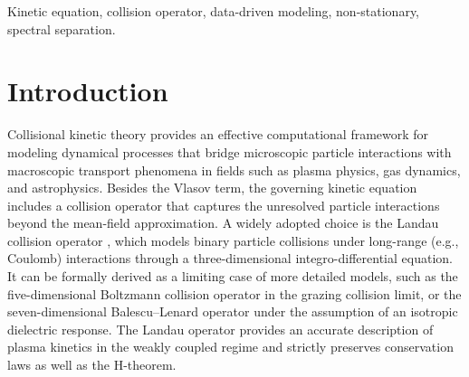 \documentclass[preprint,1p,times]{elsarticle}
\theoremstyle{definition}
\theoremstyle{remark}
\begin{document}
\begin{frontmatter}


\begin{keyword}
Kinetic equation, collision operator, data-driven modeling, non-stationary, spectral separation.
\end{keyword}

\end{frontmatter}


\section{Introduction}

Collisional kinetic theory provides an effective computational framework for modeling dynamical processes that bridge microscopic particle interactions with macroscopic transport phenomena in fields such as plasma physics, gas dynamics, and astrophysics. Besides the Vlasov term, the governing kinetic equation includes a collision operator that captures the unresolved particle interactions beyond the mean-field approximation. A widely adopted choice is the Landau collision operator \cite{landau1937kinetic}, which models binary particle collisions under long-range (e.g., Coulomb) interactions through a three-dimensional integro-differential equation.  It can be formally derived as a limiting case of more detailed models, such as the five-dimensional Boltzmann collision operator \cite{boltzmann1872weitere, wild1951boltzmann} in the grazing collision limit, or the seven-dimensional Balescu–Lenard operator \cite{lenard1960bogoliubov, balescu1960irreversible} under the assumption of an isotropic dielectric response. The Landau operator provides an accurate description of plasma kinetics in the weakly coupled regime and strictly preserves conservation laws as well as the H-theorem. 
\end{document}
